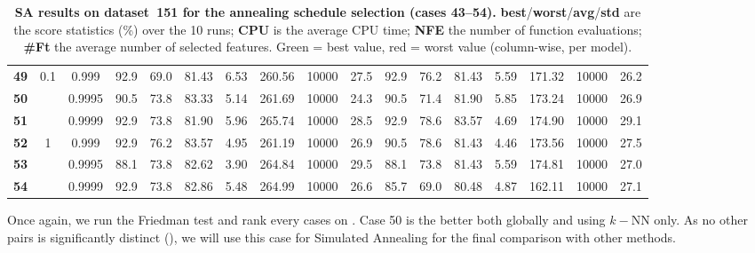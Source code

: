 \documentclass[12pt, openany]{article}
\begin{document}
\begin{table}[H]
{\begin{tabular}{|c|c|c|c c c c c c c|c c c c c c c|}
        \hdashline
        
        \textbf{49} & \multirow{3}{*}{0.1} & 0.999 & \cellcolor{best}92.9 & 69.0 & \cellcolor{worst}81.43 & 6.53 & 260.56 & 10000 & 27.5 & 92.9 & 76.2 & 81.43 & 5.59 & 171.32 & 10000 & 26.2 \\
        
        \textbf{50} & & 0.9995 & 90.5 & 73.8 & 83.33 & 5.14 & 261.69 & 10000 & 24.3 & 90.5 & 71.4 & 81.90 & 5.85 & 173.24 & 10000 & 26.9 \\
        
        \textbf{51} & & 0.9999 & \cellcolor{best}92.9 & 73.8 & 81.90 & 5.96 & 265.74 & 10000 & 28.5 & 92.9 & 78.6 & \cellcolor{best}83.57 & 4.69 & 174.90 & 10000 & 29.1 \\

        \hdashline
        
        \textbf{52} & \multirow{3}{*}{1} & 0.999 & \cellcolor{best}92.9 & 76.2 & 83.57 & 4.95 & 261.19 & 10000 & 26.9 & 90.5 & 78.6 & 81.43 & 4.46 & 173.56 & 10000 & 27.5 \\
        
        \textbf{53} & & 0.9995 & \cellcolor{worst}88.1 & 73.8 & 82.62 & 3.90 & 264.84 & 10000 & 29.5 & 88.1 & 73.8 & 81.43 & 5.59 & 174.81 & 10000 & 27.0 \\
        
        \textbf{54} & & 0.9999 & \cellcolor{best}92.9 & 73.8 & 82.86 & 5.48 & 264.99 & 10000 & 26.6 & \cellcolor{worst}85.7 & 69.0 & 80.48 & 4.87 & 162.11 & 10000 & 27.1 \\
        \hline
    \end{tabular}
    }
    \caption{\textbf{SA results on dataset~151 for the annealing schedule selection (cases 43--54).} \textbf{best}/\textbf{worst}/\textbf{avg}/\textbf{std} are the score statistics (\%) over the 10 runs; \textbf{CPU} is the average CPU time; \textbf{NFE} the number of function evaluations; \textbf{\#Ft} the average number of selected features. Green = best value, red = worst value (column-wise, per model).}
    \label{tab:results_SA_schedule_d151}
\end{table}

Once again, we run the Friedman test and rank every cases on . Case 50 is the better both globally and using $k-$NN only. As no other pairs is significantly distinct (), we will use this case for Simulated Annealing for the final comparison with other methods.
\end{document}
